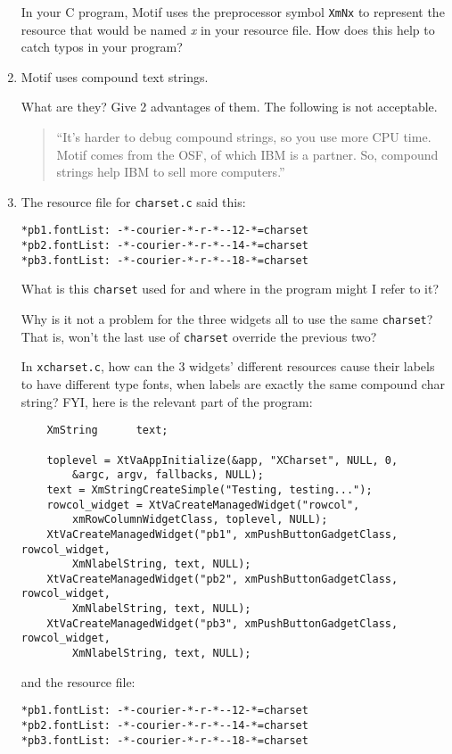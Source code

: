 \documentclass[twoside]{article}
\begin{document}
\begin{enumerate}
In your C program, Motif uses the preprocessor symbol \texttt{XmNx}
to represent the resource that would be named {\em x} in your
resource file.   How does this help to catch typos in your program?


\item Motif uses compound text strings.
\begin{enumerate}
 What are they?
 Give 2 advantages of them.  The following is not
acceptable.
\begin{quote}
``It's harder to debug compound strings, so you use more CPU time.
Motif comes from the OSF, of which IBM is a partner.  So, compound
strings help IBM to sell more computers.''
\end{quote}
\end{enumerate}

\item
The resource file for \verb+charset.c+ said this:

\begin{verbatim}
*pb1.fontList: -*-courier-*-r-*--12-*=charset
*pb2.fontList: -*-courier-*-r-*--14-*=charset
*pb3.fontList: -*-courier-*-r-*--18-*=charset
\end{verbatim}


\begin{enumerate}
 What is this \verb+charset+ used for and where in the
program might I refer to it?

 Why is it not a problem for the three widgets all to use
the same \verb+charset+?  That is, won't the last use of
\verb+charset+ override the previous two?
\end{enumerate}


 In \texttt{xcharset.c}, how can the 3 widgets' different
resources cause their labels to have different type fonts, when
labels are exactly the same compound char string?  FYI, here is
the relevant part of the program:
\begin{verbatim}
    XmString      text;

    toplevel = XtVaAppInitialize(&app, "XCharset", NULL, 0,
        &argc, argv, fallbacks, NULL);
    text = XmStringCreateSimple("Testing, testing...");
    rowcol_widget = XtVaCreateManagedWidget("rowcol",
        xmRowColumnWidgetClass, toplevel, NULL);
    XtVaCreateManagedWidget("pb1", xmPushButtonGadgetClass, rowcol_widget,
        XmNlabelString, text, NULL);
    XtVaCreateManagedWidget("pb2", xmPushButtonGadgetClass, rowcol_widget,
        XmNlabelString, text, NULL);
    XtVaCreateManagedWidget("pb3", xmPushButtonGadgetClass, rowcol_widget,
        XmNlabelString, text, NULL);
\end{verbatim}
\noindent and the resource file:
\begin{verbatim}
*pb1.fontList: -*-courier-*-r-*--12-*=charset
*pb2.fontList: -*-courier-*-r-*--14-*=charset
*pb3.fontList: -*-courier-*-r-*--18-*=charset
\end{verbatim}



\end{enumerate}
\end{document}
